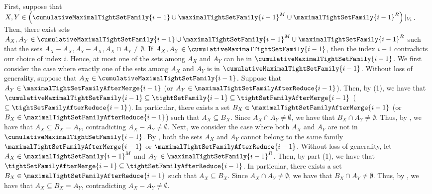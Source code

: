         First, suppose that $X, Y \in \left(\cumulativeMaximalTightSetFamily{i-1} \cup \maximalTightSetFamily{i-1}^M \cup \maximalTightSetFamily{i-1}^R\right)|_{V_i}$. Then, there exist sets $A_X, A_Y \in \cumulativeMaximalTightSetFamily{i-1} \cup \maximalTightSetFamily{i-1}^M \cup \maximalTightSetFamily{i-1}^R$ such that the sets $A_X-A_X, A_Y-A_X, A_X\cap A_Y\neq \emptyset$. If $A_X, A_Y \in \cumulativeMaximalTightSetFamily{{i-1}}$, then the index $i-1$ contradicts our choice of index $i$. Hence, at most one of the sets among $A_X$ and $A_Y$ can be in $\cumulativeMaximalTightSetFamily{{i-1}}$. 
        We first consider the case where exactly one of the sets among $A_X$ and $A_Y$ is in $\cumulativeMaximalTightSetFamily{{i-1}}$. Without loss of generality, suppose that $A_X \in \cumulativeMaximalTightSetFamily{i-1}$. Suppose that $A_Y \in \maximalTightSetFamilyAfterMerge{i-1}$ (or $A_Y\in \maximalTightSetFamilyAfterReduce{i-1}$). Then, by (1), we have that $\cumulativeMaximalTightSetFamily{i-1} \subseteq \tightSetFamily{i-1} \subseteq \tightSetFamilyAfterMerge{i-1}$ ($\subseteq \tightSetFamilyAfterReduce{i-1}$). In particular, there exists a set $B_X \in \maximalTightSetFamilyAfterMerge{i-1}$ (or $B_X \in \maximalTightSetFamilyAfterReduce{i-1}$) such that $A_X\subseteq B_X$. Since $A_X \cap A_Y \not = \emptyset$, we have that $B_X \cap A_Y \not = \emptyset$. Thus, by , we have that $A_X \subseteq B_X = A_Y$, contradicting $A_X-A_Y\neq \emptyset$. 
        Next, we consider the case where both $A_X$ and $A_Y$ are not in $\cumulativeMaximalTightSetFamily{{i-1}}$. By , both the sets $A_X$ and $A_Y$ cannot belong to the same family $\maximalTightSetFamilyAfterMerge{i-1}$ or $\maximalTightSetFamilyAfterReduce{i-1}$. Without loss of generality, let $A_X\in \maximalTightSetFamily{i-1}^M $ and $A_Y\in \maximalTightSetFamily{i-1}^R$. Then, by  part (1), we have that $\tightSetFamilyAfterMerge{i-1}\subseteq \tightSetFamilyAfterReduce{i-1}$. In particular, there exists a set $B_X \in \maximalTightSetFamilyAfterReduce{i-1}$ such that $A_X\subseteq B_X$. Since $A_X \cap A_Y \not = \emptyset$, we have that $B_X \cap A_Y \not = \emptyset$. Thus, by , we have that $A_X \subseteq B_X = A_Y$, contradicting $A_X-A_Y\neq \emptyset$. 
        
